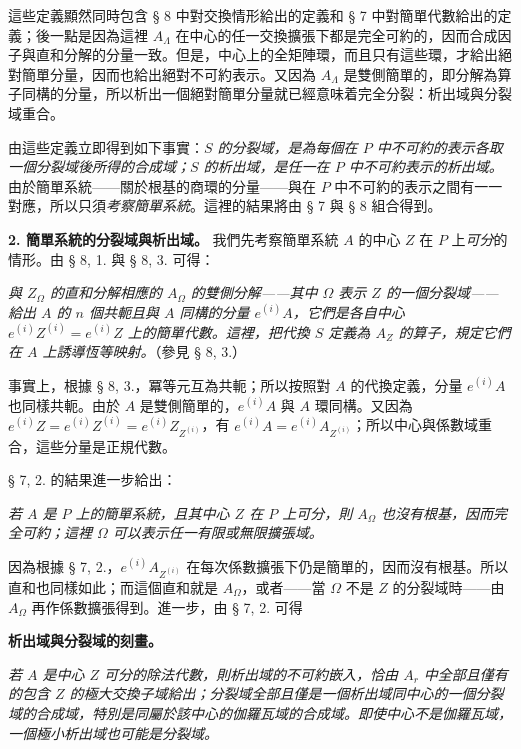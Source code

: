 \documentclass[11pt]{article}
\providecommand{\srcspaced}[1]{#1}
\begin{document}
這些定義顯然同時包含 § 8 中對交換情形給出的定義和 § 7 中對簡單代數給出的定義；後一點是因為這裡 \(A_\Lambda\) 在中心的任一交換擴張下都是完全可約的，因而合成因子與直和分解的分量一致。但是，中心上的全矩陣環，而且只有這些環，才給出絕對簡單分量，因而也給出絕對不可約表示。又因為 \(A_\Lambda\) 是雙側簡單的，即分解為算子同構的分量，所以析出一個絕對簡單分量就已經意味着完全分裂：析出域與分裂域重合。

由這些定義立即得到如下事實：\emph{\(S\) 的分裂域，是為每個在 \(P\) 中不可約的表示各取一個分裂域後所得的合成域；\(S\) 的析出域，是任一在 \(P\) 中不可約表示的析出域。} 由於簡單系統——關於根基的商環的分量——與在 \(P\) 中不可約的表示之間有一一對應，所以只須\emph{考察簡單系統}。這裡的結果將由 § 7 與 § 8 組合得到。


\noindent\textbf{\srcspaced{2. 簡單系統的分裂域與析出域。}} 我們先考察簡單系統 \(A\) 的中心 \(Z\) 在 \(P\) 上\emph{可分}的情形。由 § 8, 1. 與 § 8, 3. 可得：

\emph{與 \(Z_\Omega\) 的直和分解相應的 \(A_\Omega\) 的雙側分解——其中 \(\Omega\) 表示 \(Z\) 的一個分裂域——給出 \(A\) 的 \(n\) 個共軛且與 \(A\) 同構的分量 \(e^{(i)}A\)，它們是各自中心 \(e^{(i)}Z^{(i)}=e^{(i)}Z\) 上的簡單代數。這裡，把代換 \(S\) 定義為 \(A_Z\) 的算子，規定它們在 \(A\) 上誘導恆等映射。}（參見 § 8, 3.）

事實上，根據 § 8, 3.，冪等元互為共軛；所以按照對 \(A\) 的代換定義，分量 \(e^{(i)}A\) 也同樣共軛。由於 \(A\) 是雙側簡單的，\(e^{(i)}A\) 與 \(A\) 環同構。又因為 \(e^{(i)}Z=e^{(i)}Z^{(i)}=e^{(i)}Z_{Z^{(i)}}\)，有 \(e^{(i)}A=e^{(i)}A_{Z^{(i)}}\)；所以中心與係數域重合，這些分量是正規代數。

§ 7, 2. 的結果進一步給出：

\emph{若 \(A\) 是 \(P\) 上的簡單系統，且其中心 \(Z\) 在 \(P\) 上可分，則 \(A_\Omega\) 也沒有根基，因而完全可約；這裡 \(\Omega\) 可以表示任一有限或無限擴張域。}

因為根據 § 7, 2.，\(e^{(i)}A_{Z^{(i)}}\) 在每次係數擴張下仍是簡單的，因而沒有根基。所以直和也同樣如此；而這個直和就是 \(A_\Omega\)，或者——當 \(\Omega\) 不是 \(Z\) 的分裂域時——由 \(A_\Omega\) 再作係數擴張得到。進一步，由 § 7, 2. 可得

\begin{center}
\textbf{\srcspaced{析出域與分裂域的刻畫。}}
\end{center}

\emph{若 \(A\) 是中心 \(Z\) 可分的除法代數，則析出域的不可約嵌入，恰由 \(A_r\) 中全部且僅有的包含 \(Z\) 的極大交換子域給出；分裂域全部且僅是一個析出域同中心的一個分裂域的合成域，特別是同屬於該中心的伽羅瓦域的合成域。即使中心不是伽羅瓦域，一個極小析出域也可能是分裂域。}
\end{document}

